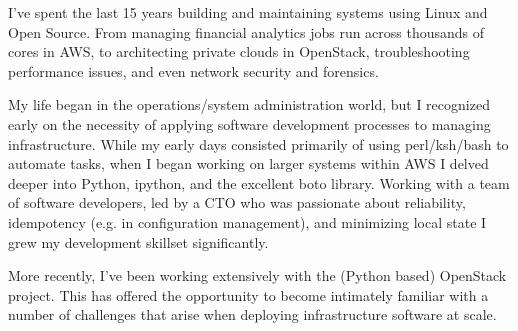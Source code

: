 \documentclass[]{shawnlower-cv}
\begin{document}
\sloppy  %

%
%

%

%
%

\nobreakvspace{3.0em}  %
%
%

\setlength\multicolsep{2pt}
\setlength{\parskip}{4pt}


\begin{multicols}{2}  %
\setlength{\parskip}{4pt}%
I've spent the last 15 years building and maintaining systems using Linux and Open Source. From managing financial analytics jobs run across thousands of cores in AWS, to architecting private clouds in OpenStack, troubleshooting performance issues, and even network security and forensics.

My life began in the operations/system administration world, but I recognized early on the necessity of applying software development processes to managing infrastructure. While my early days consisted primarily of using perl/ksh/bash to automate tasks, when I began working on larger systems within AWS I delved deeper into Python, ipython, and the excellent boto library. Working with a team of software developers, led by a CTO who was passionate about reliability, idempotency (e.g. in configuration management), and minimizing local state I grew my development skillset significantly.

More recently, I've been working extensively with the (Python based) OpenStack project. This has offered the opportunity to become intimately familiar with a number of challenges that arise when deploying infrastructure software at scale.

\end{multicols}
\end{document}

